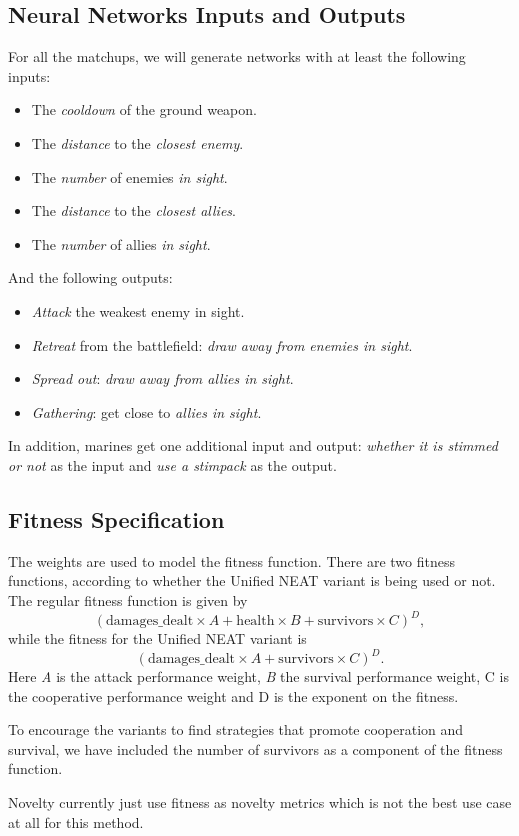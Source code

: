 \subsection{Neural Networks Inputs and Outputs}

For all the matchups, we will generate networks with at least the
following inputs:
\begin{itemize}
    \item The \emph{cooldown} of the ground weapon.
    \item The \emph{distance} to the \emph{closest enemy}.
    \item The \emph{number} of enemies \emph{in sight}.
    \item The \emph{distance} to the \emph{closest allies}.
    \item The \emph{number} of allies \emph{in sight}.
\end{itemize}

And the following outputs:
\begin{itemize}
    \item \emph{Attack} the weakest enemy in sight.
    \item \emph{Retreat} from the battlefield: \emph{draw away from enemies in sight}.
    \item \emph{Spread out}: \emph{draw away from allies in sight}.
    \item \emph{Gathering}: get close to \emph{allies in sight}.
\end{itemize}



In addition, marines get one additional input and output:
\emph{whether it is stimmed or not} as the input and \emph{use a
  stimpack} as the output.

\subsection{Fitness Specification}

The weights are used to model the fitness function. There are two
fitness functions, according to whether the Unified NEAT variant is
being used or not.  The regular fitness function is given by
\begin{equation*}
  (\text{damages\_dealt} \times A + \text{health} \times B + \text{survivors} \times C)^D,
\end{equation*}
while the fitness for the Unified NEAT variant is
\begin{equation*}
  (\text{damages\_dealt} \times A + \text{survivors} \times C)^D.
\end{equation*}
Here \emph{A} is the attack performance weight, \emph{B} the survival
performance weight, C is the cooperative performance weight and D is
the exponent on the fitness.

To encourage the variants to find strategies that promote cooperation
and survival, we have included the number of survivors as a component
of the fitness function.

Novelty currently just use fitness as novelty metrics which is not
the best use case at all for this method.

